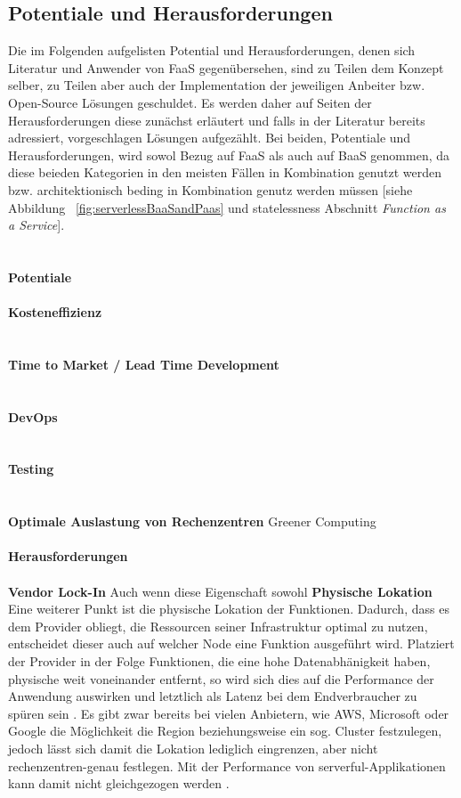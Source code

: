 \documentclass[11pt]{article}
\begin{document}
\subsection{Potentiale und Herausforderungen}
Die im Folgenden aufgelisten Potential und Herausforderungen, denen sich Literatur und Anwender von FaaS gegenübersehen, sind zu Teilen dem Konzept selber, zu Teilen aber auch der Implementation der jeweiligen Anbeiter bzw. Open-Source Lösungen geschuldet. Es werden daher auf Seiten der Herausforderungen diese zunächst erläutert und falls in der Literatur bereits adressiert, vorgeschlagen Lösungen aufgezählt. Bei beiden, Potentiale und Herausforderungen, wird sowol Bezug auf FaaS als auch auf BaaS genommen, da diese beieden Kategorien in den meisten Fällen in Kombination genutzt werden bzw. architektionisch beding in Kombination genutz werden müssen [siehe Abbildung ~\ref{fig:serverlessBaaSandPaas} und \glqq statelessness\grqq{} Abschnitt \textit{Function as a Service}].\\\\\\
{\normalsize \textbf{Potentiale}}\\\\
\textbf{Kosteneffizienz}\\
\\\\
\textbf{Time to Market / Lead Time Development}\\
\\\\
\textbf{DevOps}\\
\\\\
\textbf{Testing}\\
\\\\
\textbf{Optimale Auslastung von Rechenzentren}
Greener Computing \cite{shafiei2020serverless} \cite{fowler2018serverless}
\\\\
{\normalsize \textbf{Herausforderungen}}\\\\
\textbf{Vendor Lock-In}
Auch wenn diese Eigenschaft sowohl 
\textbf{Physische Lokation}\\
Eine weiterer Punkt ist die physische Lokation der Funktionen. Dadurch, dass es dem Provider obliegt, die Ressourcen seiner Infrastruktur optimal zu nutzen, entscheidet dieser auch auf welcher Node eine Funktion ausgeführt wird. Platziert der Provider in der Folge Funktionen, die eine hohe Datenabhänigkeit haben, physische weit voneinander entfernt, so wird sich dies auf die Performance der Anwendung auswirken und letztlich als Latenz bei dem Endverbraucher zu spüren sein \cite{shafiei2020serverless}. Es gibt zwar bereits bei vielen Anbietern, wie AWS, Microsoft oder Google die Möglichkeit die Region beziehungsweise ein sog. Cluster festzulegen, jedoch lässt sich damit die Lokation lediglich eingrenzen, aber nicht rechenzentren-genau festlegen. Mit der Performance von \glqq serverful\grqq{}-Applikationen kann damit nicht gleichgezogen werden \cite{shafiei2020serverless}.\\\\
\end{document}
